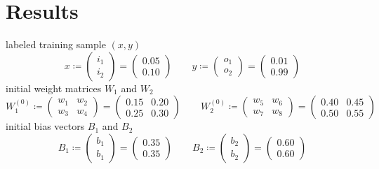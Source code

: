 \documentclass[a4paper,fleqn]{article}
\begin{document}
  \section*{Results}
  labeled training sample $(x,y)$
  \[
    x \coloneqq
    \begin{pmatrix}
      i_1 \\ i_2
    \end{pmatrix}
    =
    \begin{pmatrix}
      0.05 \\ 0.10
    \end{pmatrix}
    \qquad
    y \coloneqq
    \begin{pmatrix}
      o_1 \\ o_2
    \end{pmatrix}
    =
    \begin{pmatrix}
      0.01 \\ 0.99
    \end{pmatrix}
  \]
  initial weight matrices $W_1$ and $W_2$
  \[
    W^{(0)}_1 \coloneqq
    \begin{pmatrix}
      w_1 & w_2 \\
      w_3 & w_4
    \end{pmatrix}
    =
    \begin{pmatrix}
      0.15 & 0.20 \\
      0.25 & 0.30
    \end{pmatrix}
    \qquad
    W^{(0)}_2 \coloneqq
    \begin{pmatrix}
      w_5 & w_6 \\
      w_7 & w_8
    \end{pmatrix}
    =
    \begin{pmatrix}
      0.40 & 0.45 \\
      0.50 & 0.55
    \end{pmatrix}
  \]
  initial bias vectors $B_1$ and $B_2$
  \[
    B_1 \coloneqq
    \begin{pmatrix}
      b_1 \\ b_1
    \end{pmatrix}
    =
    \begin{pmatrix}
      0.35 \\ 0.35
    \end{pmatrix}
    \qquad
    B_2 \coloneqq
    \begin{pmatrix}
      b_2 \\ b_2
    \end{pmatrix}
    =
    \begin{pmatrix}
      0.60 \\ 0.60
    \end{pmatrix}
  \]
\end{document}
